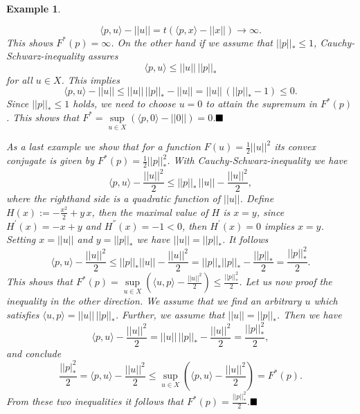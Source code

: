 \documentclass[abstracton]{scrreprt}
\newcommand{\qed}{$\hfill\blacksquare$}
\newtheorem{example}[theorem]{Example}
\newenvironment{proof}[1][Proof]{\begin{trivlist}
\item[\hskip \labelsep {\bfseries #1}]}{\end{trivlist}}
\begin{document}
\begin{example}
\begin{enumerate}
\begin{proof}
                        $$
                            \langle p, u \rangle - ||u|| = t(\langle p, x \rangle - ||x||) \longrightarrow \infty.
                        $$
                    This shows $F^{\ast}(p) = \infty$. On the other hand if we assume that $||p||_{\ast} \le 1$, Cauchy-Schwarz-inequality assures
                        $$
                            \langle p, u \rangle \le ||u|| \, ||p||_{\ast}
                        $$
                    for all $u \in X$. This implies
                        $$
                            \langle p, u \rangle - ||u|| \le ||u|| \, ||p||_{\ast} - ||u|| = ||u|| \, (||p||_{\ast} - 1) \le 0.
                        $$
                    Since $||p||_{\ast} \le 1$ holds, we need to choose $u = 0$ to attain the supremum in $F^{\ast}(p)$. This shows that $F^{\ast} = \sup\limits_{u \in X} \left( \langle p, 0 \rangle - ||0|| \right) = 0$.\qed
                \end{proof}
                \item As a last example we show that for a function $F(u) = \frac{1}{2} ||u||^{2}$ its convex conjugate is given by $F^{\ast}(p) = \frac{1}{2} ||p||_{\ast}^{2}$. With Cauchy-Schwarz-inequality we have
                    $$
                        \langle p, u \rangle - \frac{||u||^{2}}{2} \le ||p||_{\ast}\,||u|| - \frac{||u||^{2}}{2},
                    $$
                where the righthand side is a quadratic function of $||u||$. Define $H(x) := -\frac{x^{2}}{2} + y\,x$, then the maximal value of $H$ is $x = y$, since $H^{'}(x) = -x + y$ and $H^{''}(x) = -1 < 0$, then $H^{'}(x) = 0$ implies $x = y$. Setting $x = ||u||$ and $y = ||p||_{\ast}$ we have $||u|| = ||p||_{\ast}$. It follows
                    $$
                        \langle p, u \rangle - \frac{||u||^{2}}{2} \le ||p||_{\ast}||u|| - \frac{||u||^{2}}{2} = ||p||_{\ast} ||p||_{\ast} - \frac{||p||_{\ast}}{2} = \frac{||p||_{\ast}^{2}}{2}.
                    $$
                This shows that $F^{\ast}(p) = \sup\limits_{u \in X} \left( \langle u, p \rangle - \frac{||u||^{2}}{2} \right) \le \frac{||p||_{\ast}^{2}}{2}$. Let us now proof the inequality in the other direction. We assume that we find an arbitrary $u$ which satisfies $\langle u, p \rangle = ||u||\,||p||_{\ast}$. Further, we assume that $||u|| = ||p||_{\ast}$. Then we have
                    $$
                        \langle p, u \rangle - \frac{||u||^{2}}{2} = ||u||\,||p||_{\ast} - \frac{||u||^{2}}{2} = \frac{||p||^{2}_{\ast}}{2},
                    $$
                and conclude
                    $$
                        \frac{||p|_{\ast}^{2}}{2} = \langle p, u \rangle - \frac{||u||^{2}}{2} \le \sup\limits_{u \in X} \left( \langle p, u \rangle - \frac{||u||^{2}}{2} \right) = F^{\ast}(p).
                    $$
                From these two inequalities it follows that $F^{\ast}(p) = \frac{||p||_{\ast}^{2}}{2}$.\qed
            \end{enumerate}
        \end{example}
\end{document}
